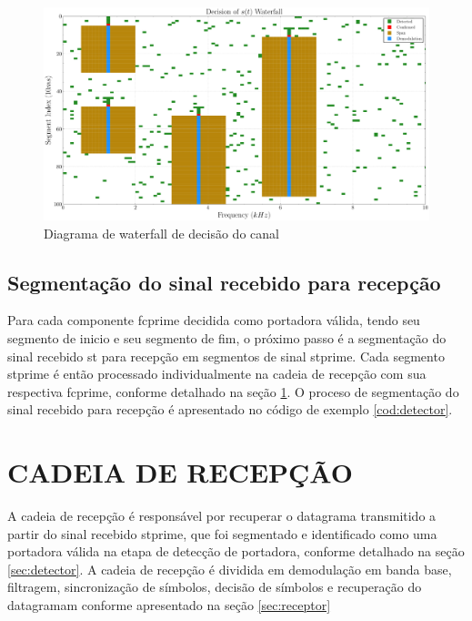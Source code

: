 \begin{figure}[H]
	\centering
	\caption{Diagrama de waterfall de decisão do canal}\label{fig:waterfall_decision}
	\includegraphics[width=\linewidth]{assets/cap3/example_detector_waterfall_decision.pdf}
\end{figure}

\subsection{Segmentação do sinal recebido para recepção}\label{sec:segmentacao_recepcao}

Para cada componente \gls{fcprime} decidida como portadora válida, tendo seu segmento de inicio e seu segmento de fim, o próximo passo é a segmentação do sinal recebido \gls{st} para recepção em segmentos de sinal \gls{stprime}. Cada segmento \gls{stprime} é então processado individualmente na cadeia de recepção com sua respectiva \gls{fcprime}, conforme detalhado na seção \ref{sec:recepcao}. O proceso de segmentação do sinal recebido para recepção é apresentado no código de exemplo \ref{cod:detector}.



\section{CADEIA DE RECEPÇÃO}\label{sec:recepcao}    

A cadeia de recepção é responsável por recuperar o datagrama transmitido a partir do sinal recebido \gls{stprime}, que foi segmentado e identificado como uma portadora válida na etapa de detecção de portadora, conforme detalhado na seção \ref{sec:detector}. A cadeia de recepção é dividida em demodulação em banda base, filtragem, sincronização de símbolos, decisão de símbolos e recuperação do datagramam conforme apresentado na seção \ref{sec:receptor}


